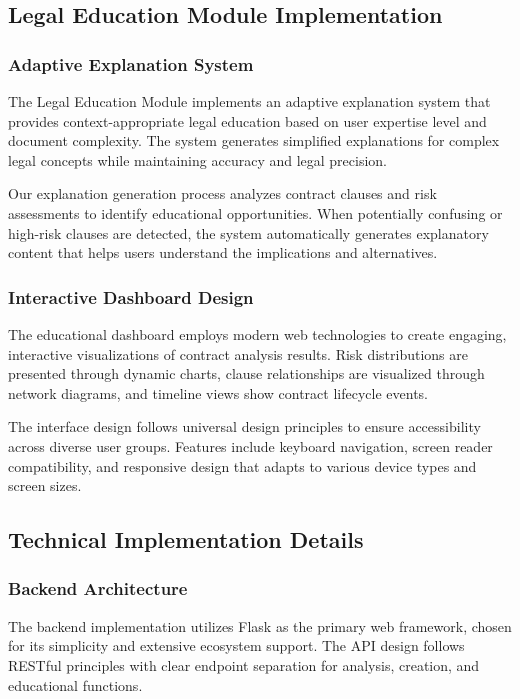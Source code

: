 \subsection{Legal Education Module Implementation}

\subsubsection{Adaptive Explanation System}

The Legal Education Module implements an adaptive explanation system that provides context-appropriate legal education based on user expertise level and document complexity. The system generates simplified explanations for complex legal concepts while maintaining accuracy and legal precision.

Our explanation generation process analyzes contract clauses and risk assessments to identify educational opportunities. When potentially confusing or high-risk clauses are detected, the system automatically generates explanatory content that helps users understand the implications and alternatives.

\subsubsection{Interactive Dashboard Design}

The educational dashboard employs modern web technologies to create engaging, interactive visualizations of contract analysis results. Risk distributions are presented through dynamic charts, clause relationships are visualized through network diagrams, and timeline views show contract lifecycle events.

The interface design follows universal design principles to ensure accessibility across diverse user groups. Features include keyboard navigation, screen reader compatibility, and responsive design that adapts to various device types and screen sizes.

\subsection{Technical Implementation Details}

\subsubsection{Backend Architecture}

The backend implementation utilizes Flask as the primary web framework, chosen for its simplicity and extensive ecosystem support. The API design follows RESTful principles with clear endpoint separation for analysis, creation, and educational functions.

